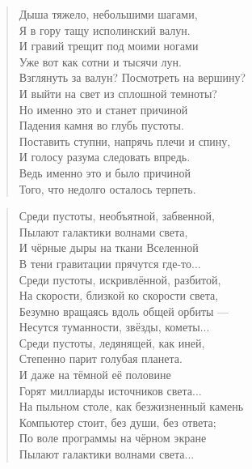 \documentclass[14pt, a4paper]{extarticle}
\begin{document}

\begin{verse}
    Дыша тяжело, небольшими шагами,\\
    Я в гору тащу исполинский валун.\\
    И гравий трещит под моими ногами\\
    Уже вот как сотни и тысячи лун.\\[4mm]
     
    Взглянуть за валун? Посмотреть на вершину?\\
    И выйти на свет из сплошной темноты?\\
    Но именно это и станет причиной\\
    Падения камня во глубь пустоты.\\[4mm]

    Поставить ступни, напрячь плечи и спину,\\
    И голосу разума следовать впредь.\\
    Ведь именно это и было причиной\\
    Того, что недолго осталось терпеть.\\
\end{verse}

\newpage

\begin{verse}
    Среди пустоты, необъятной, забвенной,\\
    Пылают галактики волнами света,\\
    И чёрные дыры на ткани Вселенной\\
    В тени гравитации прячутся где-то...\\[4mm]

    Среди пустоты, искривлённой, разбитой,\\
    На скорости, близкой ко скорости света,\\
    Безумно вращаясь вдоль общей орбиты ---\\
    Несутся туманности, звёзды, кометы...\\[4mm]

    Среди пустоты, ледянящей, как иней,\\
    Степенно парит голубая планета.\\
    И даже на тёмной её половине\\
    Горят миллиарды источников света...\\[4mm]

    На пыльном столе, как безжизненный камень\\
    Компьютер стоит, без души, без ответа;\\
    По воле программы на чёрном экране\\
    Пылают галактики волнами света...\\
\end{verse}
\end{document}

